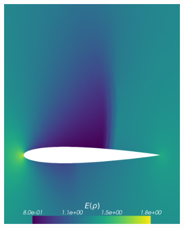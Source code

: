 \begin{figure}[h!]
\begin{subfigure}{0.329\linewidth}
		\includegraphics[width=\linewidth]{figs/Euler1DPlots5/sg_4_9_ERho.png}
		\label{fig:sub2}
	\end{subfigure}%
	\hfill
	\begin{subfigure}{0.329\linewidth}
		\centering

\end{subfigure}
\end{figure}
